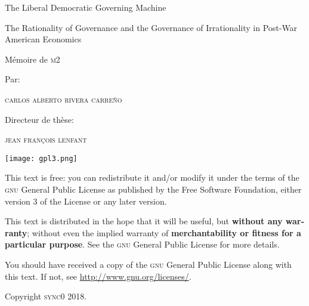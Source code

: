 \documentclass[draft=false, paper=A4,portrait,twoside=true,twocolumn=false,headinclude=false,footinclude=false,fontsize=11,BCOR=15mm,DIV=calc,pagesize=auto,titlepage=firstiscover,mpinclude=true,headings=big,headings=twolinechapter,open=right,chapterprefix=false,headsepline=false,parskip=full]{scrbook}
\author{Carlos Alberto Rivera Carreño}
\date{}
\title{}
\begin{document}
\begin{titlepage}
 \centering
 \vspace{4\baselineskip}
 {\Huge The Liberal Democratic Governing Machine \par}
 \vspace{1\baselineskip}
 {\Large The Rationality of Governance and the Governance of Irrationality in Post-War American Economics \par}
\vspace*{\fill}
 {\Large Mémoire de \textsc{m2} \par}
 \vspace{2\baselineskip}
 {\large Par: \par}
 {\large \textsc{carlos alberto rivera carreño}\par}
 \vspace{1\baselineskip}
 {\large Directeur de thèse: \par}
 {\large \textsc{jean françois lenfant}\par}
\end{titlepage}

\pagestyle{empty}

\vspace*{\fill}
\noindent
\texttt{[image: gpl3.png]}\par
\vspace{1\baselineskip}
\begin{english}
This text is free: you can redistribute it and/or modify it
under the terms of the \textsc{gnu} General Public License as published by
the Free Software Foundation, either version 3 of the License or any later
version.

This text is distributed in the hope that it will be useful, but \textbf{without
any warranty}; without even the implied warranty of \textbf{merchantability or 
fitness for a particular purpose}. See the \textsc{gnu} General 
Public License for more details.

You should have received a copy of the \textsc{gnu} General Public License along
with this text. If not, see \url{http://www.gnu.org/licenses/}.

\vspace{1\baselineskip}
\noindent
Copyright \textcopyright \textsc{sync0} 2018. 
\end{english}

\newpage 
\vspace*{\fill}
\end{document}

